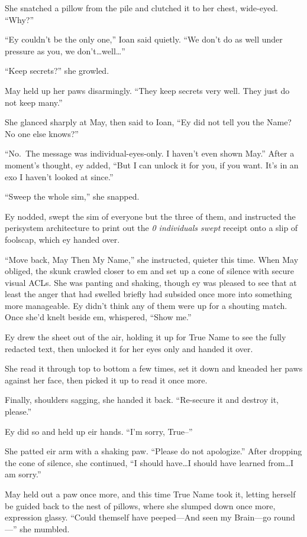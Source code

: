 She snatched a pillow from the pile and clutched it to her chest, wide-eyed. ``Why?''

``Ey couldn't be the only one,'' Ioan said quietly. ``We don't do as well under pressure as you, we don't\ldots well\ldots{}''

``Keep secrets?'' she growled.

May held up her paws disarmingly. ``They keep secrets very well. They just do not keep many.''

She glanced sharply at May, then said to Ioan, ``Ey did not tell you the Name? No one else knows?''

``No.~The message was individual-eyes-only. I haven't even shown May.'' After a moment's thought, ey added, ``But I can unlock it for you, if you want. It's in an exo I haven't looked at since.''

``Sweep the whole sim,'' she snapped.

Ey nodded, swept the sim of everyone but the three of them, and instructed the perisystem architecture to print out the \emph{0 individuals swept} receipt onto a slip of foolscap, which ey handed over.

``Move back, May Then My Name,'' she instructed, quieter this time. When May obliged, the skunk crawled closer to em and set up a cone of silence with secure visual ACLs. She was panting and shaking, though ey was pleased to see that at least the anger that had swelled briefly had subsided once more into something more manageable. Ey didn't think any of them were up for a shouting match. Once she'd knelt beside em, whispered, ``Show me.''

Ey drew the sheet out of the air, holding it up for True Name to see the fully redacted text, then unlocked it for her eyes only and handed it over.

She read it through top to bottom a few times, set it down and kneaded her paws against her face, then picked it up to read it once more.

Finally, shoulders sagging, she handed it back. ``Re-secure it and destroy it, please.''

Ey did so and held up eir hands. ``I'm sorry, True--''

She patted eir arm with a shaking paw. ``Please do not apologize.'' After dropping the cone of silence, she continued, ``I should have\ldots I should have learned from\ldots I am sorry.''

May held out a paw once more, and this time True Name took it, letting herself be guided back to the nest of pillows, where she slumped down once more, expression glassy. ``Could themself have peeped—And seen my Brain—go round —'' she mumbled.

